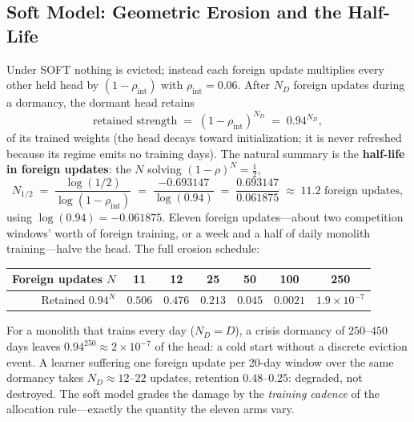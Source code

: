 \documentclass[11pt,a4paper]{article}
\theoremstyle{definition}
\theoremstyle{plain}
\begin{document}
\subsection{Soft Model: Geometric Erosion and the Half-Life}

Under SOFT nothing is evicted; instead each foreign update multiplies every
other held head by $(1 - \rho_{\mathrm{int}})$ with
$\rho_{\mathrm{int}} = 0.06$. After $N_D$ foreign updates during a dormancy,
the dormant head retains
\begin{equation}
\label{eq:dd2-soft-retention}
\text{retained strength} \;=\; (1 - \rho_{\mathrm{int}})^{N_D} \;=\; 0.94^{N_D},
\end{equation}
of its trained weights (the head decays toward initialization; it is never
refreshed because its regime emits no training days). The natural summary is
the \textbf{half-life in foreign updates}: the $N$ solving
$(1-\rho)^{N} = \tfrac12$,
\begin{equation}
\label{eq:dd2-halflife}
N_{1/2} \;=\; \frac{\log(1/2)}{\log(1 - \rho_{\mathrm{int}})}
\;=\; \frac{-0.693147}{\log(0.94)}
\;=\; \frac{0.693147}{0.061875}
\;\approx\; 11.2 \text{ foreign updates},
\end{equation}
using $\log(0.94) = -0.061875$. Eleven foreign updates---about two competition
windows' worth of foreign training, or a week and a half of daily monolith
training---halve the head. The full erosion schedule:

\begin{center}
\begin{tabular}{rcccccc}
\toprule
Foreign updates $N$ & 11 & 12 & 25 & 50 & 100 & 250 \\
\midrule
Retained $0.94^{N}$ & $0.506$ & $0.476$ & $0.213$ & $0.045$ & $0.0021$ & $1.9 \times 10^{-7}$ \\
\bottomrule
\end{tabular}
\end{center}

For a monolith that trains every day ($N_D = D$), a crisis dormancy of
$250$--$450$ days leaves $0.94^{250} \approx 2 \times 10^{-7}$ of the head:
a cold start without a discrete eviction event. A learner suffering one
foreign update per 20-day window over the same dormancy takes
$N_D \approx 12$--$22$ updates, retention $0.48$--$0.25$: degraded, not
destroyed. The soft model grades the damage by the \emph{training cadence}
of the allocation rule---exactly the quantity the eleven arms vary.
\end{document}
